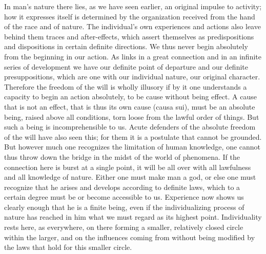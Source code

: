 \documentclass[12pt,a4paper,openany]{book}
\newcommand{\opage}[1]{\marginnote{\footnotesize\textit{[#1]}}}
\begin{document}
In man's nature there lies, as we have seen earlier, an original impulse to
activity; how it expresses itself is determined by the organization received
from the hand of the race and of nature. The individual's own experiences and
actions also leave behind them traces and after-effects, which assert
themselves as predispositions and dispositions in certain definite directions.
We thus never begin absolutely from the beginning in our action. As links in a
great connection and in an infinite series of development we have our definite
point of departure and our definite \opage{118}presuppositions, which are one
with our individual nature, our original character. Therefore the freedom of
the will is wholly illusory if by it one understands a capacity to begin an
action absolutely, to be cause without being effect. A cause that is not an
effect, that is thus its own cause (causa sui), must be an absolute being,
raised above all conditions, torn loose from the lawful order of things. But
such a being is incomprehensible to us. Acute defenders of the absolute
freedom of the will have also seen this; for them it is a postulate that
cannot be grounded. But however much one recognizes the limitation of human
knowledge, one cannot thus throw down the bridge in the midst of the world of
phenomena. If the connection here is burst at a single point, it will be all
over with all lawfulness and all knowledge of nature. Either one must make man
a god, or else one must recognize that he arises and develops according to
definite laws, which to a certain degree must be or become accessible to us.
Experience now shows us clearly enough that he is a finite being, even if the
individualizing process of nature has reached in him what we must regard as
its highest point. Individuality rests here, as everywhere, on there forming a
smaller, relatively closed circle within the larger, and on the influences
coming from without being modified by the laws that hold for this smaller
circle.
\end{document}
